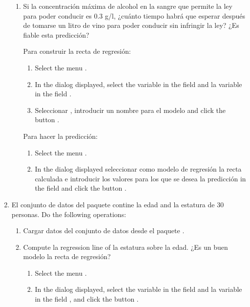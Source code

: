 \begin{enumerate}[leftmargin=*]
\begin{enumerate}
\item Si la concentración máxima de alcohol en la sangre que permite la ley para poder conducir es $0.3$ g/l, ¿cuánto
tiempo habrá que esperar después de tomarse un litro de vino para poder conducir sin infringir la ley? 
¿Es fiable esta predicción?
\begin{indication}
Para construir la recta de regresión:
\begin{enumerate}
\item Select the menu .
\item In the dialog displayed, select the variable  in the field  and la variable  in the field .
\item Seleccionar , introducir un nombre para el modelo and click the button .
\end{enumerate}
Para hacer la predicción:
\begin{enumerate}
\item Select the menu .
\item In the dialog displayed seleccionar como modelo de regresión la recta calculada e introducir los
valores para los que se desea la predicción in the field  and click the button
.
\end{enumerate}
\end{indication}
\end{enumerate}


\item El conjunto de datos  del paquete  contine la edad and la estatura
de 30 personas. 
Do the following operations:
\begin{enumerate}
\item Cargar datos del conjunto de datos  desde el paquete .

\item Compute la regression line of la estatura sobre la edad. ¿Es un buen modelo la recta de regresión?
\begin{indication}
\begin{enumerate}
\item Select the menu .
\item In the dialog displayed, select the variable  in the field  and la variable  in the field , and click the button
.
\end{enumerate}
\end{indication}


\end{enumerate}
\end{enumerate}

